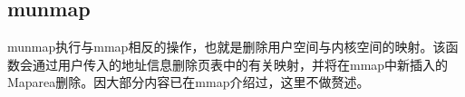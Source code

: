 \subsection{munmap}

munmap执行与mmap相反的操作，也就是删除用户空间与内核空间的映射。该函数会通过用户传入的地址信息删除页表中的有关映射，并将在mmap中新插入的Maparea删除。因大部分内容已在mmap介绍过，这里不做赘述。